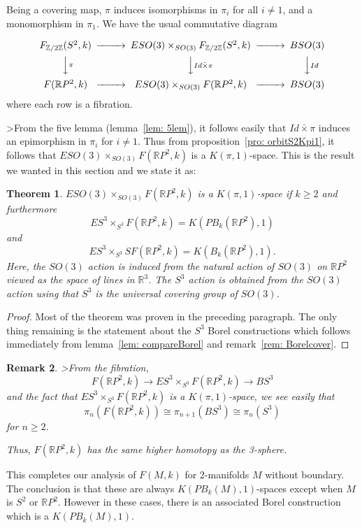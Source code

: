 \documentclass{amsart}
\newtheorem{thm}{Theorem}[section]
\newtheorem{rem}[thm]{Remark}
\newcommand{\RR}{\mathbb{R}}
\newcommand{\Ztwo}{\mathbb{Z}/2\mathbb{Z}}
\begin{document}
Being a covering map, $\pi$ induces isomorphisms in $\pi_i$ for all
$i \neq 1$, and a monomorphism in $\pi_1$.
We have the usual commutative diagram

$$
\begin{CD}
F_{\Ztwo}(S^2,k) @>>> ESO(3) \times_{SO(3)} F_{\Ztwo}(S^2,k)
@>>> BSO(3) \\
@VV \pi V @VV Id \bar{\times} \pi V @VV Id V \\
F(\RR P^2,k) @>>> ESO(3) \times_{SO(3)} F(\RR P^2,k) @>>> BSO(3)
\end{CD}
$$
where each row is a fibration.

>From the five lemma (lemma~\ref{lem: 5lem}), it follows easily
that $Id \bar{\times} \pi$ induces an epimorphism in $\pi_i$ for
$i \neq 1$. Thus from proposition~\ref{pro: orbitS2Kpi1}, it follows that
$ ESO(3) \times_{SO(3)} F(\RR P^2,k)$ is a $K(\pi,1)$-space. 
This is the result we wanted in this section and we state it as:

\begin{thm}
\label{thm: BorelconfRP2Kpi1}
$ESO(3) \times_{SO(3)} F(\RR P^2,k)$ is a $K(\pi,1)$-space if $k \geq 2$ and
furthermore
$$
ES^3 \times_{S^3} F(\RR P^2,k) = K(PB_k(\RR P^2),1) 
$$
and 
$$
ES^3 \times_{S^3} SF(\RR P^2,k) = K(B_k(\RR P^2),1).
$$ 
Here, the $SO(3)$ action is induced from the natural action of
$SO(3)$ on $\RR P^2$ viewed as the space of lines in $\RR^3$.
The $S^3$ action is obtained from the $SO(3)$ action using that
$S^3$ is the universal covering group of $SO(3)$. 
\end{thm}
\begin{proof}
Most of the theorem was proven in the preceding paragraph. The
only thing remaining is the statement about the $S^3$ Borel
constructions which follows immediately from lemma~\ref{lem: compareBorel}
and remark~\ref{rem: Borelcover}. 
\end{proof}

\begin{rem}
>From the fibration, 
$$
F(\RR P^2,k) \rightarrow ES^3 \times_{S^3} F(\RR P^2,k) \rightarrow
BS^3
$$
and the fact that $ES^3 \times_{S^3} F(\RR P^2,k)$ is a $K(\pi,1)$-space,
we see easily that
$$
\pi_n(F(\RR P^2,k)) \cong \pi_{n+1}(BS^3) \cong \pi_{n}(S^3)
$$
for $n \geq 2$.

Thus, $F(\RR P^2,k)$ has the same higher homotopy as the 3-sphere.
\end{rem}

This completes our analysis of $F(M,k)$ for 2-manifolds $M$
without boundary.
The conclusion is that these are always $K(PB_k(M),1)$-spaces except
when $M$ is $S^2$ or $\RR P^2$. However in these cases,
there is an associated Borel construction which is a $K(PB_k(M),1)$.
\end{document}
